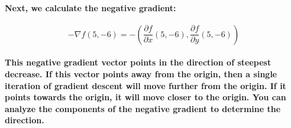 \documentclass[11pt]{article} %
\begin{document}
\paragraph{Next, we calculate the negative gradient:}
% 
$$
-\nabla f(5, -6) = -\left(\frac{\partial f}{\partial x}(5, -6), \frac{\partial f}{\partial y}(5, -6)\right)
$$
% 
\paragraph{This negative gradient vector points in the direction of steepest decrease. If this vector points away from the origin, then a single iteration of gradient descent will move further from the origin. If it points towards the origin, it will move closer to the origin. You can analyze the components of the negative gradient to determine the direction.}
% 
% 
% 
% 
% 
\end{document}
